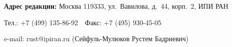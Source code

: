 {\thispagestyle{empty}

\noindent
\textbf{Адрес редакции:} Москва 119333, ул.~Вавилова, д.~44, корп.~2, ИПИ РАН

\noindent
{}Тел.: +7 (499) 135-86-92\ \ Факс:  +7 (495) 930-45-05  

\noindent
{}e-mail:   {\sf rust@ipiran.ru} (Сейфуль-Мулюков Рустем Бадриевич)
}




